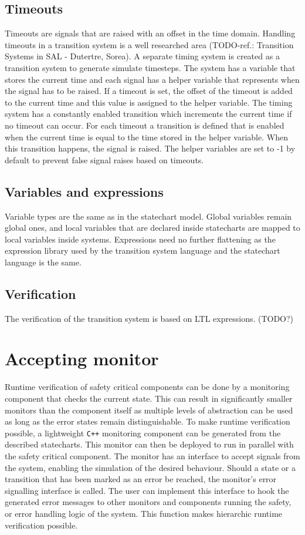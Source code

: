 {  \subsection{Timeouts}
Timeouts are signals that are raised with an offset in the time domain. Handling timeouts in a transition system is a well researched area (TODO-ref.: Transition Systems in SAL - Dutertre, Sorea). A separate timing system is created as a transition system to generate simulate timesteps. The system has a variable that stores the current time and each signal has a helper variable that represents when the signal has to be raised. If a timeout is set, the offset of the timeout is added to the current time and this value is assigned to the helper variable. The timing system has a constantly enabled transition which increments the current time if no timeout can occur. For each timeout a transition is defined that is enabled when the current time is equal to the time stored in the helper variable. When this transition happens, the signal is raised. The helper variables are set to -1 by default to prevent false signal raises based on timeouts.
  \subsection{Variables and expressions}
Variable types are the same as in the statechart model. Global variables remain global ones, and local variables that are declared inside statecharts are mapped to local variables inside systems. Expressions need no further flattening as the expression library used by the transition system language and the statechart language is the same.
  \subsection{Verification}
The verification of the transition system is based on LTL expressions. (TODO?)
\section{Accepting monitor}
Runtime verification of safety critical components can be done by a monitoring component that checks the current state. This can result in significantly smaller monitors than the component itself as multiple levels of abstraction can be used as long as the error states remain distinguishable. To make runtime verification possible, a lightweight \verb!C++! monitoring component can be generated from the described statecharts. This monitor can then be deployed to run in parallel with the safety critical component. The monitor has an interface to accept signals from the system, enabling the simulation of the desired behaviour. Should a state or a transition that has been marked as an error be reached, the monitor's error signalling interface is called. The user can implement this interface to hook the generated error messages to other monitors and components running the safety, or error handling logic of the system. This function makes hierarchic runtime verification possible.
}
